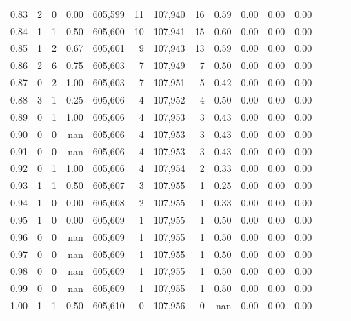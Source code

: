\begin{tabular}{rrrrrrrrrrrrrrr}
0.83 &       2 &      0 &  0.00 &  605,599 &       11 &  107,940 &       16 &  0.59 &  0.00 &  0.00 &      0.00 \\
0.84 &       1 &      1 &  0.50 &  605,600 &       10 &  107,941 &       15 &  0.60 &  0.00 &  0.00 &      0.00 \\
0.85 &       1 &      2 &  0.67 &  605,601 &        9 &  107,943 &       13 &  0.59 &  0.00 &  0.00 &      0.00 \\
0.86 &       2 &      6 &  0.75 &  605,603 &        7 &  107,949 &        7 &  0.50 &  0.00 &  0.00 &      0.00 \\
0.87 &       0 &      2 &  1.00 &  605,603 &        7 &  107,951 &        5 &  0.42 &  0.00 &  0.00 &      0.00 \\
0.88 &       3 &      1 &  0.25 &  605,606 &        4 &  107,952 &        4 &  0.50 &  0.00 &  0.00 &      0.00 \\
0.89 &       0 &      1 &  1.00 &  605,606 &        4 &  107,953 &        3 &  0.43 &  0.00 &  0.00 &      0.00 \\
0.90 &       0 &      0 &   nan &  605,606 &        4 &  107,953 &        3 &  0.43 &  0.00 &  0.00 &      0.00 \\
0.91 &       0 &      0 &   nan &  605,606 &        4 &  107,953 &        3 &  0.43 &  0.00 &  0.00 &      0.00 \\
0.92 &       0 &      1 &  1.00 &  605,606 &        4 &  107,954 &        2 &  0.33 &  0.00 &  0.00 &      0.00 \\
0.93 &       1 &      1 &  0.50 &  605,607 &        3 &  107,955 &        1 &  0.25 &  0.00 &  0.00 &      0.00 \\
0.94 &       1 &      0 &  0.00 &  605,608 &        2 &  107,955 &        1 &  0.33 &  0.00 &  0.00 &      0.00 \\
0.95 &       1 &      0 &  0.00 &  605,609 &        1 &  107,955 &        1 &  0.50 &  0.00 &  0.00 &      0.00 \\
0.96 &       0 &      0 &   nan &  605,609 &        1 &  107,955 &        1 &  0.50 &  0.00 &  0.00 &      0.00 \\
0.97 &       0 &      0 &   nan &  605,609 &        1 &  107,955 &        1 &  0.50 &  0.00 &  0.00 &      0.00 \\
0.98 &       0 &      0 &   nan &  605,609 &        1 &  107,955 &        1 &  0.50 &  0.00 &  0.00 &      0.00 \\
0.99 &       0 &      0 &   nan &  605,609 &        1 &  107,955 &        1 &  0.50 &  0.00 &  0.00 &      0.00 \\
1.00 &       1 &      1 &  0.50 &  605,610 &        0 &  107,956 &        0 &   nan &  0.00 &  0.00 &      0.00 \\
\bottomrule
\end{tabular}
